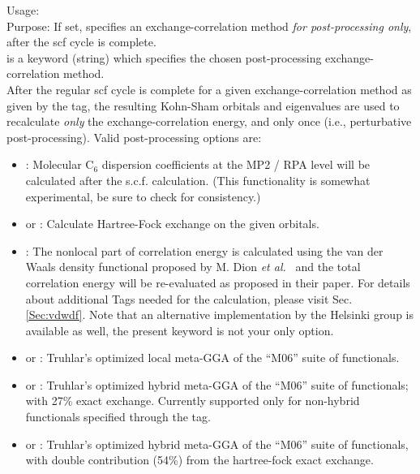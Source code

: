 { \noindent
 Usage:   \\[1.0ex]
 Purpose: If set, specifies an exchange-correlation method \emph{for
   post-processing only}, after the scf cycle is complete. \\[1.0ex]
  is a keyword (string) which specifies the chosen
   post-processing exchange-correlation method. \\
}
After the regular scf cycle is complete for a given exchange-correlation
method as given by the  tag, the resulting Kohn-Sham orbitals and
eigenvalues are used to recalculate \emph{only} the exchange-correlation
energy, and only once (i.e., perturbative post-processing). Valid
post-processing options  are:
\begin{itemize}
  \item {} : Molecular C$_6$ dispersion coefficients at the
    MP2 / RPA level will be calculated after the
    s.c.f. calculation. (This functionality is somewhat experimental,
    be sure to check for consistency.)
  \item {} or : Calculate Hartree-Fock exchange on the
    given orbitals.
  \item {} : The nonlocal part of correlation energy is calculated
    using the van der Waals density functional proposed by M.
    Dion {\it et al.}~\cite{Dion04} and the total correlation
    energy will be re-evaluated as proposed in their paper. For
    details about additional Tags needed for the calculation,
    please visit Sec. \ref{Sec:vdwdf}. Note that an alternative
    implementation by the Helsinki group is available as well, the
    present keyword is not your only option.
  \item {} or : Truhlar's optimized local meta-GGA of the ``M06'' suite of
  functionals. \cite{ZhaoTruhlar06_M06-L}
  \item {} or : Truhlar's optimized hybrid meta-GGA of the ``M06'' suite of
    functionals; with 27\% exact exchange. \cite{ZhaoTruhlar06_M06_M06-2X}
    Currently supported only for non-hybrid functionals specified through the  tag.
  \item {} or : Truhlar's optimized hybrid meta-GGA of the ``M06'' suite of
    functionals, with double contribution (54\%) from the hartree-fock exact exchange. \cite{ZhaoTruhlar06_M06_M06-2X}

\end{itemize}
